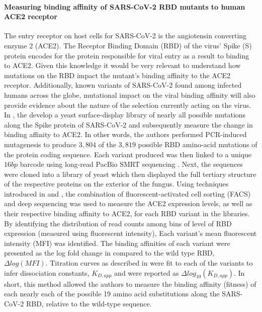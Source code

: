 \documentclass{article}
\begin{document}
\paragraph{Measuring binding affinity of SARS-CoV-2 RBD mutants to human ACE2 receptor}
The entry receptor on host cells for SARS-CoV-2 is the angiotensin converting enzyme 2 (ACE2).
The Receptor Binding Domain (RBD) of the virus' Spike (S) protein encodes for the protein responsible for viral entry as a result to binding to ACE2.
Given this knowledge it would be very relevant to understand how mutations on the RBD impact the mutant's binding affinity to the ACE2 receptor.
Additionally, known variants of SARS-CoV-2 found among infected humans across the globe, mutational impact on the viral binding affinity will also provide evidence about the nature of the selection currently acting on the virus.
In \citet{Starr2020}, the develop a yeast surface-display library of nearly all possible mutations along the Spike protein of SARS-CoV-2 and subsequently measure the change in binding affinity to ACE2.
In other words, the authors performed PCR-induced mutagenesis to produce $3,804$ of the $3,819$ possible RBD amino-acid mutations of the protein coding sequence.
Each variant produced was then linked to a unique $16bp$ barcode using long-read PacBio SMRT sequencing \citep{Matreyek2018}.
Next, the sequences were cloned into a library of yeast which then displayed the full tertiary structure of the respective proteins on the exterior of the fungus.
Using techniques introduced in \citet{Adams2016} and \citet{Peterman2016}, the combination of fluorescent-activated cell sorting (FACS) and deep sequencing was used to measure the ACE2 expression levels, as well as their respective binding affinity to ACE2, for each RBD variant in the libraries. 
By identifying the distribution of read counts among bins of level of RBD expression (measured using fluorescent intensity), Each variant's mean fluorescent intensity (MFI) was identified.
The binding affinities of each variant were presented as the log fold change in compared to the wild type RBD, $\Delta log(MFI)$.
Titration curves as described in \citet{Peterman2016} were fit to each of the variants to infer dissociation constants, $K_{D, app}$ and were reported as $\Delta log_{10}(K_{D, app})$.
In short, this method allowed the authors to measure the binding affinity (fitness) of each nearly each of the possible 19 amino acid substitutions along the SARS-CoV-2 RBD, relative to the wild-type sequence.
\end{document}
